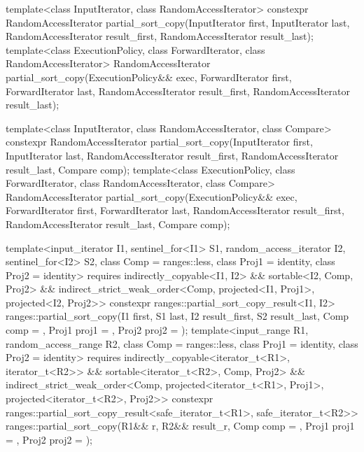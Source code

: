 %
\begin{itemdecl}
template<class InputIterator, class RandomAccessIterator>
  constexpr RandomAccessIterator
    partial_sort_copy(InputIterator first, InputIterator last,
                      RandomAccessIterator result_first,
                      RandomAccessIterator result_last);
template<class ExecutionPolicy, class ForwardIterator, class RandomAccessIterator>
  RandomAccessIterator
    partial_sort_copy(ExecutionPolicy&& exec,
                      ForwardIterator first, ForwardIterator last,
                      RandomAccessIterator result_first,
                      RandomAccessIterator result_last);

template<class InputIterator, class RandomAccessIterator,
         class Compare>
  constexpr RandomAccessIterator
    partial_sort_copy(InputIterator first, InputIterator last,
                      RandomAccessIterator result_first,
                      RandomAccessIterator result_last,
                      Compare comp);
template<class ExecutionPolicy, class ForwardIterator, class RandomAccessIterator,
         class Compare>
  RandomAccessIterator
    partial_sort_copy(ExecutionPolicy&& exec,
                      ForwardIterator first, ForwardIterator last,
                      RandomAccessIterator result_first,
                      RandomAccessIterator result_last,
                      Compare comp);

template<input_iterator I1, sentinel_for<I1> S1, random_access_iterator I2, sentinel_for<I2> S2,
         class Comp = ranges::less, class Proj1 = identity, class Proj2 = identity>
  requires indirectly_copyable<I1, I2> && sortable<I2, Comp, Proj2> &&
           indirect_strict_weak_order<Comp, projected<I1, Proj1>, projected<I2, Proj2>>
  constexpr ranges::partial_sort_copy_result<I1, I2>
    ranges::partial_sort_copy(I1 first, S1 last, I2 result_first, S2 result_last,
                              Comp comp = {}, Proj1 proj1 = {}, Proj2 proj2 = {});
template<input_range R1, random_access_range R2, class Comp = ranges::less,
         class Proj1 = identity, class Proj2 = identity>
  requires indirectly_copyable<iterator_t<R1>, iterator_t<R2>> &&
           sortable<iterator_t<R2>, Comp, Proj2> &&
           indirect_strict_weak_order<Comp, projected<iterator_t<R1>, Proj1>,
                                      projected<iterator_t<R2>, Proj2>>
  constexpr ranges::partial_sort_copy_result<safe_iterator_t<R1>, safe_iterator_t<R2>>
    ranges::partial_sort_copy(R1&& r, R2&& result_r, Comp comp = {},
                              Proj1 proj1 = {}, Proj2 proj2 = {});
\end{itemdecl}


